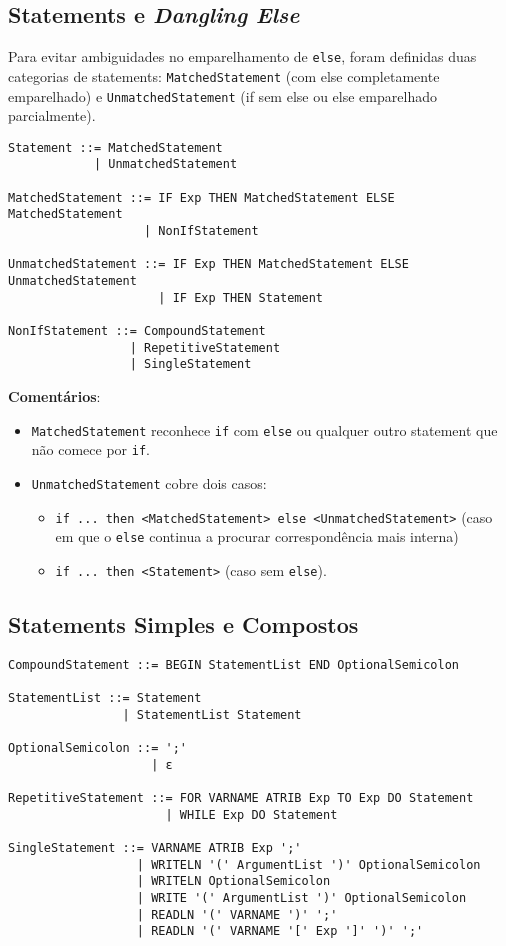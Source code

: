 \subsection{Statements e \emph{Dangling Else}}

Para evitar ambiguidades no emparelhamento de \texttt{else}, foram definidas duas categorias de statements: 
\texttt{MatchedStatement} (com else completamente emparelhado) e \texttt{UnmatchedStatement} (if sem else ou else emparelhado parcialmente).

\begin{verbatim}
Statement ::= MatchedStatement
            | UnmatchedStatement

MatchedStatement ::= IF Exp THEN MatchedStatement ELSE MatchedStatement
                   | NonIfStatement

UnmatchedStatement ::= IF Exp THEN MatchedStatement ELSE UnmatchedStatement
                     | IF Exp THEN Statement

NonIfStatement ::= CompoundStatement
                 | RepetitiveStatement
                 | SingleStatement
\end{verbatim}

\noindent

\textbf{Comentários}:
\begin{itemize}
    \item \texttt{MatchedStatement} reconhece \texttt{if} com \texttt{else} ou qualquer outro statement que não comece por \texttt{if}.
    \item \texttt{UnmatchedStatement} cobre dois casos:
    \begin{itemize}
        \item \texttt{if ... then <MatchedStatement> else <UnmatchedStatement>} (caso em que o \texttt{else} continua a procurar correspondência mais interna)
        \item \texttt{if ... then <Statement>} (caso sem \texttt{else}).
    \end{itemize}
\end{itemize}

\subsection{Statements Simples e Compostos}

\begin{verbatim}
CompoundStatement ::= BEGIN StatementList END OptionalSemicolon

StatementList ::= Statement
                | StatementList Statement

OptionalSemicolon ::= ';'
                    | ε

RepetitiveStatement ::= FOR VARNAME ATRIB Exp TO Exp DO Statement
                      | WHILE Exp DO Statement

SingleStatement ::= VARNAME ATRIB Exp ';'
                  | WRITELN '(' ArgumentList ')' OptionalSemicolon
                  | WRITELN OptionalSemicolon
                  | WRITE '(' ArgumentList ')' OptionalSemicolon
                  | READLN '(' VARNAME ')' ';'
                  | READLN '(' VARNAME '[' Exp ']' ')' ';'
\end{verbatim}

